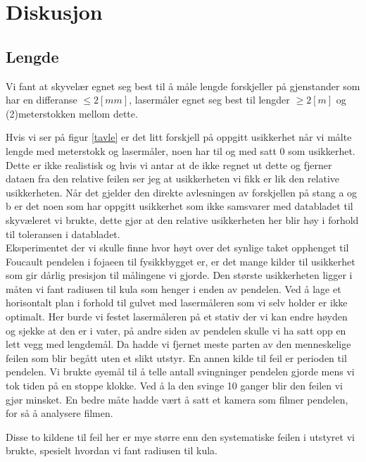 \documentclass[norsk,a4paper,12pt]{article}
\begin{document}
\newpage
\section{Diskusjon}

\subsection{Lengde}
Vi fant at skyvelær egnet seg best til å måle lengde forskjeller på gjenstander som har en differanse $\leq 2[mm]$, lasermåler egnet seg best til lengder $\geq 2[m]$ og (2)meterstokken mellom dette. 

Hvis vi ser på figur \vref{tavle} er det litt forskjell på oppgitt usikkerhet når vi målte lengde med meterstokk og lasermåler, noen har til og med satt 0 som usikkerhet. Dette er ikke realistisk og hvis vi antar at de ikke regnet ut dette og fjerner dataen fra den relative feilen ser jeg at usikkerheten vi fikk er lik den relative usikkerheten. Når det gjelder den direkte avlesningen av forskjellen på stang a og b er det noen som har oppgitt usikkerhet som ikke samsvarer med databladet til skyvæleret vi brukte, dette gjør at den relative usikkerheten her blir høy i forhold til toleransen i databladet. \\

Eksperimentet der vi skulle finne hvor høyt over det synlige taket opphenget til Foucault pendelen i fojaeen til fysikkbygget er, er det mange kilder til usikkerhet som gir dårlig presisjon til målingene vi gjorde. Den største usikkerheten ligger i måten vi fant radiusen til kula som henger i enden av pendelen. Ved å lage et horisontalt plan i forhold til gulvet med lasermåleren som vi selv holder er ikke optimalt. Her burde vi festet lasermåleren på et stativ der vi kan endre høyden og sjekke at den er i vater, på andre siden av pendelen skulle vi ha satt opp en lett vegg med lengdemål. Da hadde vi fjernet meste parten av den menneskelige feilen som blir begått uten et slikt utstyr. 
En annen kilde til feil er perioden til pendelen. Vi brukte øyemål til å telle antall svingninger pendelen gjorde mens vi tok tiden på en stoppe klokke. Ved å la den svinge 10 ganger blir den feilen vi gjør minsket. En bedre måte hadde vært å satt et kamera som filmer pendelen, for så å analysere filmen. 

Disse to kildene til feil her er mye større enn den systematiske feilen i utstyret vi brukte, spesielt hvordan vi fant radiusen til kula. \\
\end{document}
